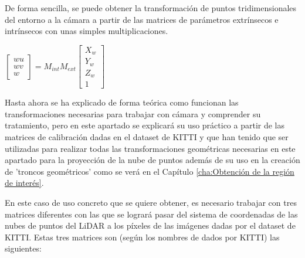De forma sencilla, se puede obtener la transformación de puntos tridimensionales del entorno a la cámara a partir de las matrices de parámetros extrínsecos e intrínsecos con unas simples multiplicaciones.

\begin{center}
$
\begin{bmatrix} wu \\ wv \\ w \end{bmatrix}
=
M_{int} M_{ext}
\begin{bmatrix} X_w \\ Y_w \\ Z_w \\ 1 \end{bmatrix}
$
\end{center}

Hasta ahora se ha explicado de forma teórica como funcionan las transformaciones necesarias para trabajar con cámara y comprender su tratamiento, pero en este apartado se explicará su uso práctico a partir de las matrices de calibración dadas en el dataset de KITTI y que han tenido que ser utilizadas para realizar todas las transformaciones geométricas necesarias en este apartado para la proyección de la nube de puntos además de su uso en la creación de 'troncos geométricos' como se verá en el Capítulo \ref{cha:Obtención de la región de interés}.

En este caso de uso concreto que se quiere obtener, es necesario trabajar con tres matrices diferentes con las que se logrará pasar del sistema de coordenadas de las nubes de puntos del \ac{LiDAR} a los píxeles de las imágenes dadas por el dataset de KITTI. Estas tres matrices son (según los nombres de dados por KITTI) las siguientes:

